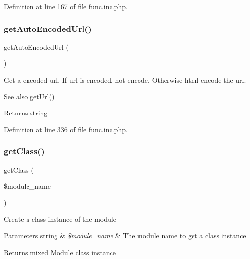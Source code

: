 Definition at line 167 of file func.\+inc.\+php.

\mbox{\label{func_8inc_8php_a77e631a54eea5ecea3a77feb56129104}} 
\subsubsection{\texorpdfstring{get\+Auto\+Encoded\+Url()}{getAutoEncodedUrl()}}
{\footnotesize\ttfamily get\+Auto\+Encoded\+Url (\begin{DoxyParamCaption}{ }\end{DoxyParamCaption})}

Get a encoded url. If url is encoded, not encode. Otherwise html encode the url.

\begin{DoxySeeAlso}{See also}
\hyperlink{func_8inc_8php_accd14bda49a1044b4d8dd93f020f11ee}{get\+Url()} 
\end{DoxySeeAlso}
\begin{DoxyReturn}{Returns}
string 
\end{DoxyReturn}


Definition at line 336 of file func.\+inc.\+php.

\mbox{\label{func_8inc_8php_a1d90f6abc9ca2d1a4500071159ebd4e7}} 
\subsubsection{\texorpdfstring{get\+Class()}{getClass()}}
{\footnotesize\ttfamily get\+Class (\begin{DoxyParamCaption}\item[{}]{\$module\+\_\+name }\end{DoxyParamCaption})}

Create a class instance of the module


\begin{DoxyParams}[1]{Parameters}
string & {\em \$module\+\_\+name} & The module name to get a class instance \\
\hline
\end{DoxyParams}
\begin{DoxyReturn}{Returns}
mixed Module class instance 
\end{DoxyReturn}


